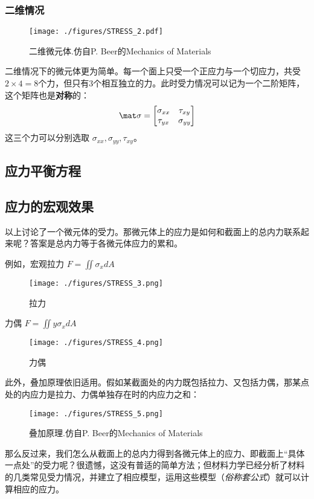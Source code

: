 \subsubsection{二维情况}
\begin{figure}[ht]
\centering
\texttt{[image: ./figures/STRESS\_2.pdf]}
\caption{二维微元体.仿自P. Beer的Mechanics of Materials} \label{STRESS_fig2}
\end{figure}

二维情况下的微元体更为简单。每一个面上只受一个正应力与一个切应力，共受$2\times4=8$个力，但只有3个相互独立的力。此时受力情况可以记为一个二阶矩阵，这个矩阵也是\textbf{对称}的：
\begin{equation}
\mat \sigma=
\begin{bmatrix}
\sigma_{xx} & \tau_{xy}\\
\tau_{yx} & \sigma_{yy}\\
\end{bmatrix}
\end{equation}
这三个力可以分别选取 $\sigma_{xx}, \sigma_{yy}, \tau_{xy}$。

\subsection{应力平衡方程}

\subsection{应力的宏观效果}
以上讨论了一个微元体的受力。那微元体上的应力是如何和截面上的总内力联系起来呢？答案是总内力等于各微元体应力的累和。

例如，宏观拉力 $F = \iint \sigma_x dA$
\begin{figure}[ht]
\centering
\texttt{[image: ./figures/STRESS\_3.png]}
\caption{拉力} \label{STRESS_fig3}
\end{figure}

力偶 $F = \iint y\sigma_x dA$
\begin{figure}[ht]
\centering
\texttt{[image: ./figures/STRESS\_4.png]}
\caption{力偶} \label{STRESS_fig4}
\end{figure}

此外，叠加原理依旧适用。假如某截面处的内力既包括拉力、又包括力偶，那某点处的内应力是拉力、力偶单独存在时的内应力之和：
\begin{figure}[ht]
\centering
\texttt{[image: ./figures/STRESS\_5.png]}
\caption{叠加原理.仿自P. Beer的Mechanics of Materials} \label{STRESS_fig5}
\end{figure}

那么反过来，我们怎么从截面上的总内力得到各微元体上的应力、即截面上“具体一点处”的受力呢？很遗憾，这没有普适的简单方法；但材料力学已经分析了材料的几类常见受力情况，并建立了相应模型，运用这些模型（\textsl{俗称套公式}）就可以计算相应的应力。
